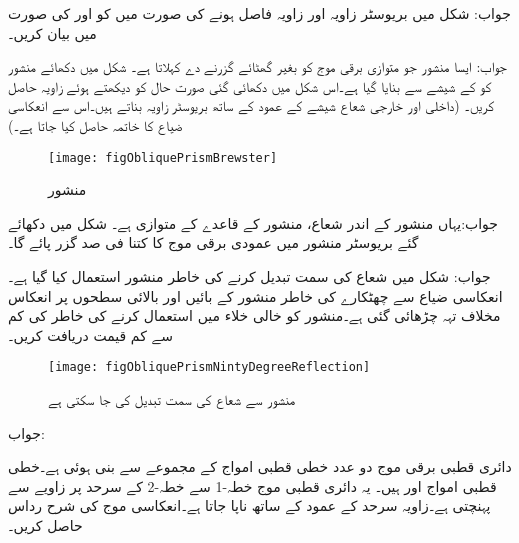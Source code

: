 جواب:
شکل  میں  بریوسٹر زاویہ اور  زاویہ فاصل ہونے کی صورت میں  کو  اور  کی صورت میں بیان کریں۔

جواب:
ایسا منشور جو  متوازی برقی موج کو بغیر گھٹائے گزرنے دے  کہلاتا ہے۔ شکل  میں دکھائے منشور کو  کے شیشے سے بنایا گیا ہے۔اس شکل میں دکھائی گئی صورت حال کو دیکھتے ہوئے زاویہ  حاصل کریں۔ (داخلی اور خارجی شعاع شیشے کے عمود کے ساتھ بریوسٹر زاویہ بناتے ہیں۔اس سے انعکاسی ضیاع کا خاتمہ حاصل کیا جاتا ہے۔)
\begin{figure}
\centering
\texttt{[image: figObliquePrismBrewster]}
\caption{منشور}
\label{شکل_ترچھی_منشور}
\end{figure}

جواب:یہاں منشور کے اندر شعاع، منشور کے قاعدے کے متوازی ہے۔ 
شکل  میں دکھائے گئے بریوسٹر منشور میں عمودی برقی موج کا کتنا فی صد گزر پائے گا۔

جواب:
شکل  میں شعاع کی سمت  تبدیل کرنے کی خاطر منشور استعمال کیا گیا ہے۔انعکاسی ضیاع سے چھٹکارے کی خاطر منشور کے بائیں اور بالائی سطحوں پر انعکاس مخلاف تہہ چڑھائی گئی ہے۔منشور کو خالی خلاء میں استعمال کرنے کی خاطر  کی کم سے کم قیمت دریافت کریں۔ 
\begin{figure}
\centering
\texttt{[image: figObliquePrismNintyDegreeReflection]}
\caption{منشور سے شعاع کی سمت تبدیل کی جا سکتی ہے}
\label{شکل_ترچھی_منشور_سمت_تبدیل}
\end{figure}

جواب:

دائری قطبی برقی موج دو عدد خطی قطبی امواج کے مجموعے سے بنی ہوئی ہے۔خطی قطبی امواج  اور  ہیں۔ یہ دائری قطبی موج خطہ-1  سے خطہ-2   کے سرحد پر  زاویے سے  پہنچتی ہے۔زاویہ سرحد کے عمود کے ساتھ ناپا جاتا ہے۔انعکاسی موج کی شرح رداس حاصل کریں۔

